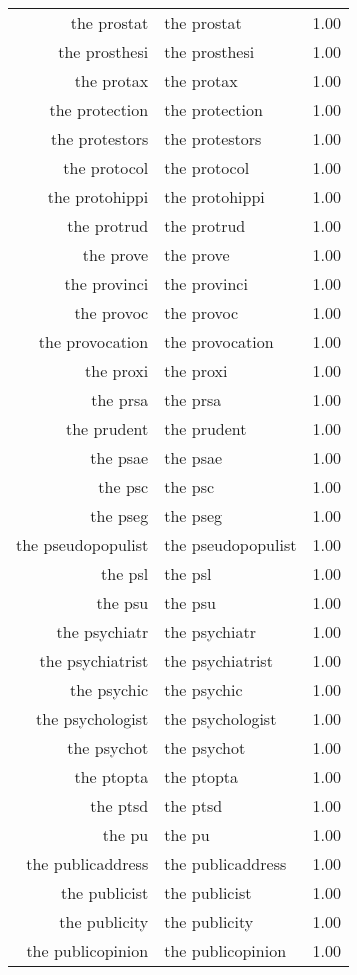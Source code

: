 \begin{table}[ht]
\begin{tabular}{rlr}
  the prostat & the prostat & 1.00 \\ 
  the prosthesi & the prosthesi & 1.00 \\ 
  the protax & the protax & 1.00 \\ 
  the protection & the protection & 1.00 \\ 
  the protestors & the protestors & 1.00 \\ 
  the protocol & the protocol & 1.00 \\ 
  the protohippi & the protohippi & 1.00 \\ 
  the protrud & the protrud & 1.00 \\ 
  the prove & the prove & 1.00 \\ 
  the provinci & the provinci & 1.00 \\ 
  the provoc & the provoc & 1.00 \\ 
  the provocation & the provocation & 1.00 \\ 
  the proxi & the proxi & 1.00 \\ 
  the prsa & the prsa & 1.00 \\ 
  the prudent & the prudent & 1.00 \\ 
  the psae & the psae & 1.00 \\ 
  the psc & the psc & 1.00 \\ 
  the pseg & the pseg & 1.00 \\ 
  the pseudopopulist & the pseudopopulist & 1.00 \\ 
  the psl & the psl & 1.00 \\ 
  the psu & the psu & 1.00 \\ 
  the psychiatr & the psychiatr & 1.00 \\ 
  the psychiatrist & the psychiatrist & 1.00 \\ 
  the psychic & the psychic & 1.00 \\ 
  the psychologist & the psychologist & 1.00 \\ 
  the psychot & the psychot & 1.00 \\ 
  the ptopta & the ptopta & 1.00 \\ 
  the ptsd & the ptsd & 1.00 \\ 
  the pu & the pu & 1.00 \\ 
  the publicaddress & the publicaddress & 1.00 \\ 
  the publicist & the publicist & 1.00 \\ 
  the publicity & the publicity & 1.00 \\ 
  the publicopinion & the publicopinion & 1.00 \\ 

\end{tabular}
\end{table}
